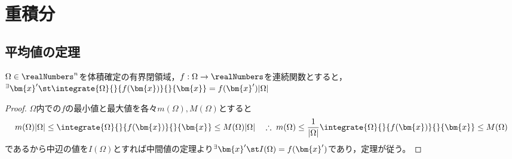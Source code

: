 \chapter{重積分}
    \section{平均値の定理}
        \begin{shadebox}
            $\Omega\in\realNumbers^n$を体積確定の有界閉領域，$f:\Omega\to\realNumbers$を連続関数とすると，$^\exists\bm{x}'\st\integrate{\Omega}{}{f(\bm{x})}{}{\bm{x}} = f(\bm{x}')|\Omega|$
        \end{shadebox}
        \begin{proof}
            \quad\par
            $\Omega$内での$f$の最小値と最大値を各々$m(\Omega),M(\Omega)$とすると
            \[m(\Omega)|\Omega| \leq \integrate{\Omega}{}{f(\bm{x})}{}{\bm{x}} \leq M(\Omega)|\Omega|\quad\therefore\;m(\Omega) \leq \frac{1}{|\Omega|}\integrate{\Omega}{}{f(\bm{x})}{}{\bm{x}} \leq M(\Omega)\]
            であるから中辺の値を$I(\Omega)$とすれば中間値の定理より$^\exists\bm{x}'\st I(\Omega) = f(\bm{x}')$であり，定理が従う。
        \end{proof}

